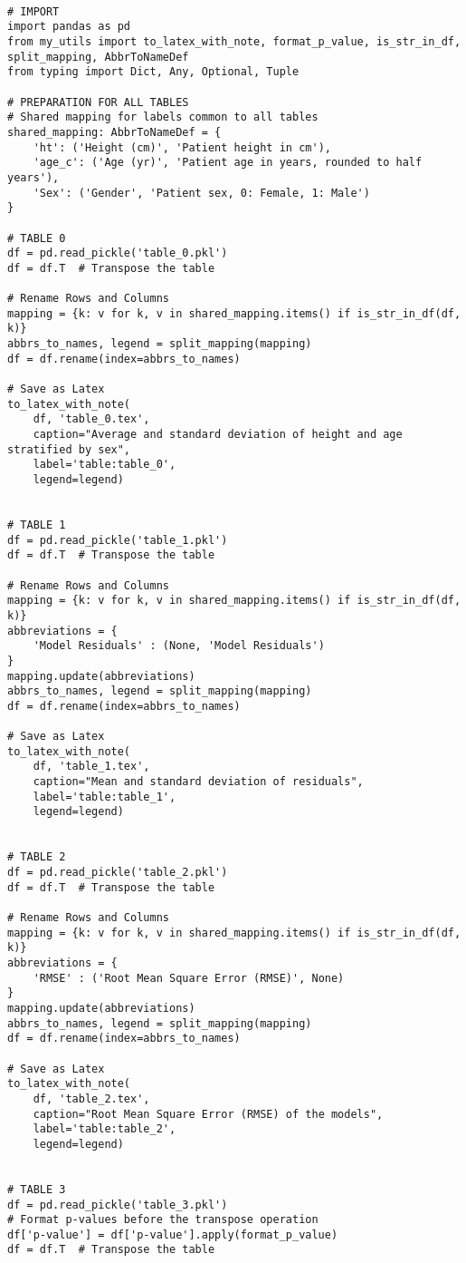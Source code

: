 \documentclass[11pt]{article}
\begin{document}
\begin{verbatim}

# IMPORT
import pandas as pd
from my_utils import to_latex_with_note, format_p_value, is_str_in_df, split_mapping, AbbrToNameDef
from typing import Dict, Any, Optional, Tuple

# PREPARATION FOR ALL TABLES
# Shared mapping for labels common to all tables
shared_mapping: AbbrToNameDef = {
    'ht': ('Height (cm)', 'Patient height in cm'),
    'age_c': ('Age (yr)', 'Patient age in years, rounded to half years'),
    'Sex': ('Gender', 'Patient sex, 0: Female, 1: Male')
}

# TABLE 0
df = pd.read_pickle('table_0.pkl')
df = df.T  # Transpose the table

# Rename Rows and Columns
mapping = {k: v for k, v in shared_mapping.items() if is_str_in_df(df, k)}
abbrs_to_names, legend = split_mapping(mapping)
df = df.rename(index=abbrs_to_names)

# Save as Latex
to_latex_with_note(
    df, 'table_0.tex',
    caption="Average and standard deviation of height and age stratified by sex",
    label='table:table_0',
    legend=legend)


# TABLE 1
df = pd.read_pickle('table_1.pkl')
df = df.T  # Transpose the table

# Rename Rows and Columns
mapping = {k: v for k, v in shared_mapping.items() if is_str_in_df(df, k)}
abbreviations = { 
    'Model Residuals' : (None, 'Model Residuals')
}
mapping.update(abbreviations)
abbrs_to_names, legend = split_mapping(mapping)
df = df.rename(index=abbrs_to_names)

# Save as Latex
to_latex_with_note(
    df, 'table_1.tex',
    caption="Mean and standard deviation of residuals",
    label='table:table_1',
    legend=legend)


# TABLE 2
df = pd.read_pickle('table_2.pkl')
df = df.T  # Transpose the table

# Rename Rows and Columns
mapping = {k: v for k, v in shared_mapping.items() if is_str_in_df(df, k)}
abbreviations = { 
    'RMSE' : ('Root Mean Square Error (RMSE)', None)
}
mapping.update(abbreviations)
abbrs_to_names, legend = split_mapping(mapping)
df = df.rename(index=abbrs_to_names)

# Save as Latex
to_latex_with_note(
    df, 'table_2.tex',
    caption="Root Mean Square Error (RMSE) of the models",
    label='table:table_2',
    legend=legend)


# TABLE 3
df = pd.read_pickle('table_3.pkl')
# Format p-values before the transpose operation
df['p-value'] = df['p-value'].apply(format_p_value)
df = df.T  # Transpose the table


\end{verbatim}
\end{document}
